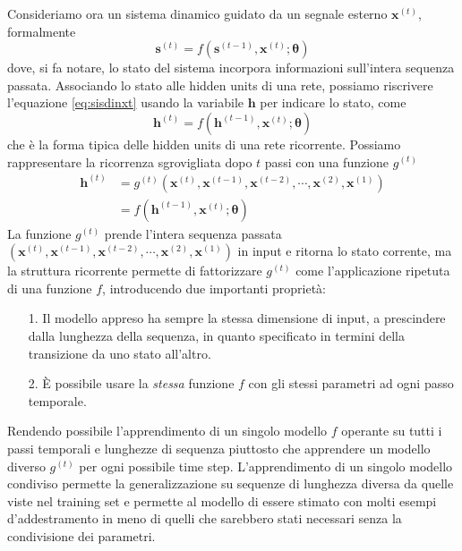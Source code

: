 \documentclass[12pt,a4paper]{report}
\begin{document}
    \smallskip
    Consideriamo ora un sistema dinamico guidato da un segnale esterno
    $\boldsymbol{x}^{(t)}$, formalmente
    \begin{equation} \label{eq:sisdinxt}
        \boldsymbol{s}^{(t)} =
        f(\boldsymbol{s}^{(t-1)},
            \boldsymbol{x}^{(t)};
            \boldsymbol{\theta})
    \end{equation}
    dove, si fa notare, lo stato del sistema incorpora informazioni 
    sull'intera sequenza passata. Associando lo stato alle hidden units
    di una rete, possiamo riscrivere l'equazione \ref{eq:sisdinxt} 
    usando la variabile $\boldsymbol{h}$ per indicare lo stato, come
    \begin{equation} \label{eq:rechidden}
        \boldsymbol{h}^{(t)} =
        f(\boldsymbol{h}^{(t-1)},
            \boldsymbol{x}^{(t)};
            \boldsymbol{\theta})
    \end{equation}
    che \`e la forma tipica delle hidden units di una rete ricorrente.
    Possiamo rappresentare la ricorrenza sgrovigliata dopo $t$ passi con
    una funzione $g^{(t)}$
    \begin{align} \label{eq:recg}
        \boldsymbol{h}^{(t)} &=
        g^{(t)}(\boldsymbol{x}^{(t)}, \boldsymbol{x}^{(t-1)}, 
            \boldsymbol{x}^{(t-2)}, \cdots, \boldsymbol{x}^{(2)}, 
            \boldsymbol{x}^{(1)})\\
        &=f(\boldsymbol{h}^{(t-1)},
            \boldsymbol{x}^{(t)};
            \boldsymbol{\theta})
    \end{align}
    La funzione $g^{(t)}$ prende l'intera sequenza passata 
    $(\boldsymbol{x}^{(t)}, \boldsymbol{x}^{(t-1)},
    \boldsymbol{x}^{(t-2)}, \cdots, \boldsymbol{x}^{(2)},
    \boldsymbol{x}^{(1)})$ in input e ritorna lo stato corrente, ma
    la struttura ricorrente permette di fattorizzare $g^{(t)}$ come
    l'applicazione ripetuta di una funzione $f$, introducendo due 
    importanti propriet\`a:
    \begin{itemize}
    \item[1.]Il modello appreso ha sempre la stessa dimensione di input,
        a prescindere dalla lunghezza della sequenza, in quanto
        specificato in termini della transizione da uno stato all'altro.
    \item[2.]\`E possibile usare la \textit{stessa} funzione $f$ con gli
        stessi parametri ad ogni passo temporale.
    \end{itemize}
    Rendendo possibile l'apprendimento di un singolo modello $f$ 
    operante su tutti i passi temporali e lunghezze di sequenza 
    piuttosto che apprendere un modello diverso $g^{(t)}$ per ogni 
    possibile time step. L'apprendimento di un singolo modello condiviso
    permette la generalizzazione su sequenze di lunghezza diversa da
    quelle viste nel training set e permette al modello di essere 
    stimato con molti esempi d'addestramento in meno di quelli che 
    sarebbero stati necessari senza la condivisione dei parametri.
\end{document}
